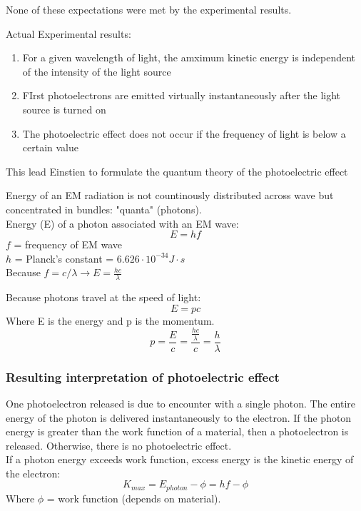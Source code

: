\documentclass[class=article,crop=false]{standalone}
\begin{document}
\begin{question}
None of these expectations were met by the experimental results.
\end{question}
Actual Experimental results:
\begin{enumerate}
	\item For a given wavelength of light, the amximum kinetic energy is independent of the intensity of the light source
	\item FIrst photoelectrons are emitted virtually instantaneously after the light source is turned on
	\item The photoelectric effect does not occur if the frequency of light is below a certain value
\end{enumerate}

\begin{question}
	This lead Einstien to formulate the quantum theory of the photoelectric effect
\end{question}

\begin{result}
	Energy of an EM radiation is not countinously distributed across wave but concentrated in bundles: "quanta" (photons).\\
	Energy (E) of a photon associated with an EM wave: \\
	$$ E = hf $$
	$f$ = frequency of EM wave\\
	$h$ = Planck's constant = $6.626 \cdot 10^{-34} J \cdot s$ \\
	Because $f = c/\lambda \rightarrow E = \frac{hc}{\lambda}$
\end{result}
Because photons travel at the speed of light:
$$ E = pc $$
Where E is the energy and p is the momentum.
$$ p = \frac{E}{c} = \frac{\frac{hc}{\lambda}}{c} = \frac{h}{\lambda} $$

\subsubsection{Resulting interpretation of photoelectric effect}
One photoelectron released is due to encounter with a single photon. The entire energy of the photon is delivered instantaneously to the electron. If the photon energy is greater than the work function of a material, then a photoelectron is released. Otherwise, there is no photoelectric effect. \\

If a photon energy exceeds work function, excess energy is the kinetic energy of the electron: 
$$ K_{max} = E_{photon} - \phi = hf - \phi $$
Where $\phi$ = work function (depends on material).\\
\end{document}
